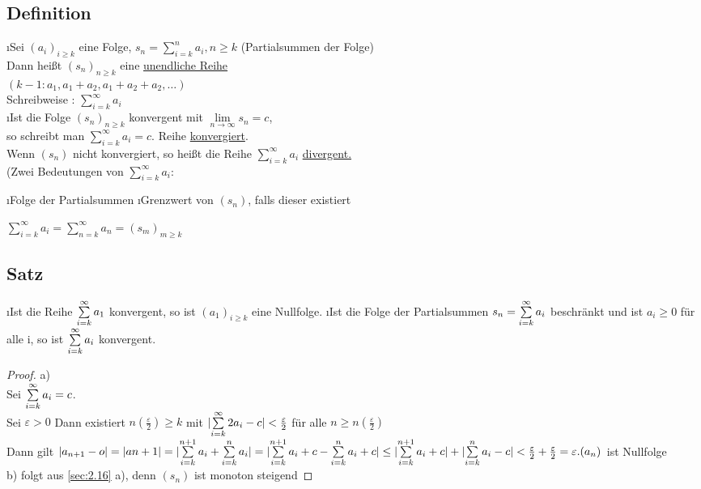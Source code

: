 \subsection{Definition}
\begin{enumerate}[a)]
\i Sei $(a_i)_{i \geq k}$ eine Folge, $s_n = \sum\limits_{i = k}^{n} a_i , n \geq k$ (Partialsummen der Folge)\\
Dann hei\ss t $(s_n)_{n \geq k}$ eine \underline{unendliche Reihe}\\
$(k-1: a_1, a_1+a_2, a_1 + a_2 + a_2,\ldots)$\\
Schreibweise : $\sum\limits_{i = k}^{\infty} a_i$\\
\i Ist die Folge $(s_n)_{n \geq k}$ konvergent mit $\lim\limits_{n \rightarrow \infty} s_n = c$,\\
so schreibt man $\sum\limits_{i = k}^{\infty} a_i =c.$ Reihe \underline{konvergiert}.\\
Wenn $(s_n)$ nicht konvergiert, so hei\ss t die Reihe $\sum\limits_{i =k}^{\infty} a_i$ \underline{divergent.}\\
(Zwei Bedeutungen von $\sum\limits_{i = k}^{\infty} a_i:$\\
\begin{enumerate}[-]
\i Folge der Partialsummen
\i Grenzwert von $(s_n)$, falls dieser existiert
\end{enumerate}
$\sum\limits_{i=k}^{\infty} a_i = \sum\limits_{n=k}^{\infty} a_n = (s_m)_{m \geq k}$
\end{enumerate}
\subsection[Satz: Reihenkonvergenz]{Satz}
\begin{enumerate}[a)]
\i Ist die Reihe $\sum\limits_{i=k}^{\infty} a_1$ konvergent, so ist $(a_1)_{i \geq k}$ eine Nullfolge.
\i Ist die Folge der Partialsummen $s_n = \sum\limits_{i=k}^{\infty} a_i$ beschränkt und ist $a_i \geq 0$ für alle i, so ist $\sum\limits_{i=k}^{\infty} a_i$ konvergent.
\begin{proof}
a)\\
Sei $\sum\limits_{i=k}^{\infty} a_i = c$.\\
Sei $\varepsilon > 0$ Dann existiert $n(\frac{\varepsilon}{2}) \geq k$ mit $\lvert \sum\limits_{i=k}^{\infty} 2{a_i - c} \rvert < \frac{\varepsilon	}{2}$ für alle $ n \geq n(\frac{\varepsilon}{2})$\\
Dann gilt $\lvert a_{n+1} -o \rvert = \lvert a{n+1} \rvert = \lvert \sum\limits_{i=k}^{n+1} a_i + \sum\limits_{i=k}^{n} a_i \rvert = \\
\lvert \sum\limits_{i=k}^{n+1} a_i+c-\sum\limits_{i=k}^{n} a_i +c \rvert \leq \lvert \sum\limits_{i=k}^{n+1} a_i+c \rvert+\lvert \sum\limits_{i=k}^{n} a_i -c \rvert <  \frac{\varepsilon}{2} + \frac{\varepsilon}{2} = \varepsilon.\\
(a_n)$ ist Nullfolge\\
b) folgt aus \ref{sec:2.16} a), denn $(s_n)$ ist monoton steigend
\end{proof}
\end{enumerate}
